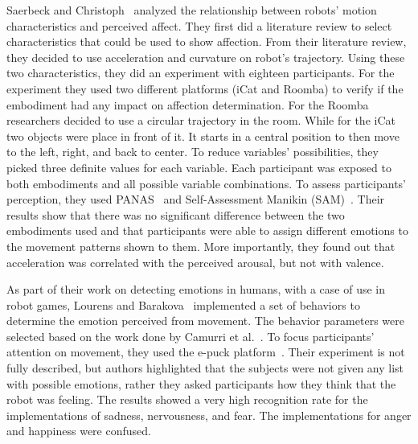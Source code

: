 Saerbeck and Christoph~\cite{Saerbeck2010} analyzed the relationship between robots' motion characteristics and perceived affect. They first did a literature review to select characteristics that could be used to show affection. From their literature review, they decided to use acceleration and curvature on robot's trajectory. 
Using these two characteristics, they did an experiment with eighteen participants. For the experiment they used two different platforms (iCat and Roomba) to verify if the embodiment had any impact on affection determination. For the Roomba researchers decided to use a circular trajectory in the room. While for the iCat two objects were place in front of it. It starts in a central position to then move to the left, right, and back to center. 
To reduce variables' possibilities, they picked three definite values for each variable. Each participant was exposed to both embodiments and all possible variable combinations. To assess participants' perception, they used PANAS~\cite{WatsonClarkTellegen88} and Self-Assessment Manikin (SAM)~\cite{Lang2008}. Their results show that there was no significant difference between the two embodiments used and that participants were able to assign different emotions to the movement patterns shown to them. 
More importantly, they found out that acceleration was correlated with the perceived arousal, but not with valence. 

As part of their work on detecting emotions in humans, with a case of use in robot games, Lourens and Barakova~\cite{BarakovaL10} implemented a set of behaviors to determine the emotion  perceived from movement. The behavior parameters were selected based on the work done by Camurri et al.~\cite{pop00002}. To focus participants' attention on movement, they used the e-puck platform~\cite{Mondada09thee-puck}. 
Their experiment is not fully described, but authors highlighted that the subjects were not given any list with possible emotions, rather they asked participants how they think that the robot was feeling. The results showed a very high recognition rate for the implementations of sadness, nervousness, and fear. The implementations for anger and happiness were confused. 

